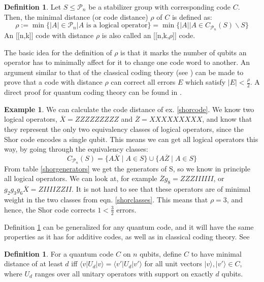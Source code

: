 \documentclass{article}
\def\P{\mathcal{P}}
\theoremstyle{definition}
\newtheorem{ex}[Satz]{Example}
\newtheorem{defn}[Satz]{Definition}
\begin{document}

\begin{defn}\label{defdist}
Let $S \leq \P_n$ be a stabilizer group with corresponding code $C$. Then, the minimal distance (or code distance) $\rho$ of $C$ is defined as:
\begin{equation} \rho := \min \{ |A| \in \P_n | A \text{ is a logical operator} \} = \min \{ |A| \mid A \in C_{\P_n}(S)\backslash S \} \end{equation}
An [[n,k]] code with distance $\rho$ is also called an [[n,k,$\rho$]] code.
\end{defn}



The basic idea for the definition of $\rho$ is that it marks the number of qubits an operator has to minimally affect for it to change one code word to another. 
An argument similar to that of the classical coding theory (see \cite{classicalcodes}) can be made to prove that a code with distance $\rho$ can correct all errors $E$ which satisfy $|E| < \frac{\rho}{2}$. A direct proof for quantum coding theory can be found in \cite{leemhuis}.

\begin{ex}
We can calculate the code distance of ex.  \ref{shorcode}. We know two logical operators, $\overline X = ZZZZZZZZZ$ and $\overline Z = XXXXXXXXX$, and know that they represent the only two equivalency classes of logical operators, since the Shor code encodes a single qubit.
This means we can get all logical operators this way, by going through the equivalency classes: \begin{equation}\label{shorclasses} C_{\P_n}(S) = \{ A \overline X \mid A \in S \} \cup \{ A \overline Z \mid A \in S \} \end{equation} From table  \ref{shorgenerators} we get the generators of S, so we know in principle all logical operators.
We can look at, for example $ \overline Z g_8 = ZZZIIIIII$, or $g_2 g_3 g_6 \overline X = ZIIIIZZII$. It is not hard to see that these operators are of minimal weight in the two classes from eqn.  \ref{shorclasses}. This means that $\rho = 3$, and hence, 
the Shor code corrects $1 < \frac{3}{2}$ errors. 
\end{ex}

Definition \ref{defdist} can be generalized for any quantum code, and it will have the same properties as it has for additive codes, as well as in classical coding theory. See \cite{nebe}
\begin{defn}\label{distgeneral}
For a quantum code $C$ on $n$ qubits, define $C$ to have minimal distance of at least $d$ iff $\langle v | U_d | v \rangle = \langle v' | U_d | v' \rangle$ for all unit vectors $|v \rangle, |v' \rangle \in C$, where $U_d$ ranges over all unitary operators with support on exactly $d$ qubits.
\end{defn}
\end{document}
